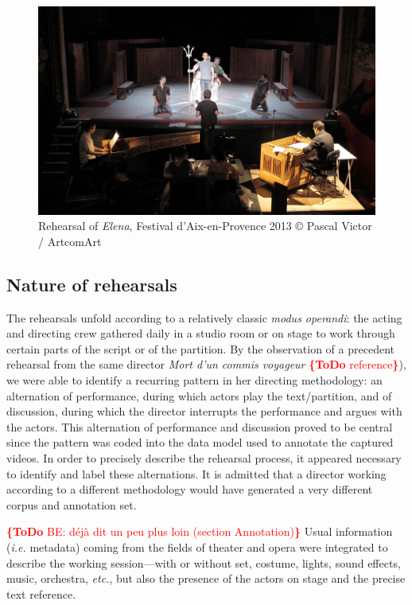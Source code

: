 \documentclass[conference]{IEEEtran}
\newcommand{\todo}[1]{\noindent\textcolor{red}{{\bf \{ToDo} #1{\bf \}}}}
\begin{document}
\begin{figure}[htb!]
  \centering
  \includegraphics[width=\columnwidth]{elena}
  \caption{Rehearsal of \emph{Elena}, Festival d’Aix-en-Provence 2013 © Pascal Victor / ArtcomArt}
  \label{fig:elena}
\end{figure}


\subsection{Nature of rehearsals}

The rehearsals unfold according to a relatively classic \emph{modus operandi}: the acting and directing crew gathered daily in a studio room or on stage to work through certain parts of the script or of the partition. By the observation of a precedent rehearsal from the same director \emph{Mort d'un commis voyageur} \todo{reference}), we were able to identify a recurring pattern in her directing methodology: an alternation of performance, during which actors play the text/partition, and of discussion, during which the director interrupts the performance and argues with the actors. This alternation of performance and discussion proved to be central since the pattern was coded into the data model used to annotate the captured videos.
In order to precisely describe the rehearsal process, it appeared necessary to identify and label these alternations.
It is admitted that a director working according to a different methodology would have generated a very different corpus and annotation set.

\todo{BE: déjà dit un peu plus loin (section Annotation)}
Usual information (\emph{i.e.} metadata) coming from the fields of theater and opera were integrated to describe the working session---with or without set, costume, lights, sound effects, music, orchestra, \emph{etc.}, but also the presence of the actors on stage and the precise text reference.
\end{document}
